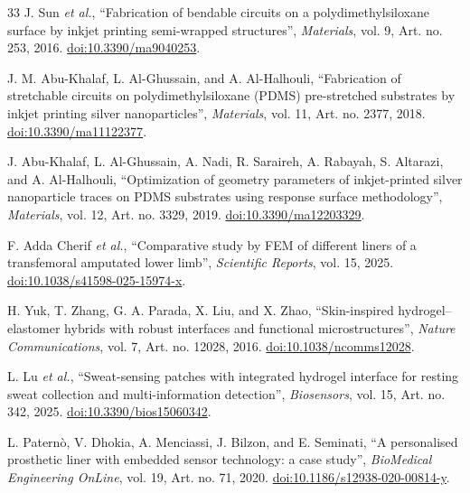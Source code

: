 \begin{thebibliography}{33}
J. Sun \textit{et al.}, \textquotedblleft Fabrication of bendable circuits on
a polydimethylsiloxane surface by inkjet printing semi-wrapped
structures\textquotedblright, \textit{Materials}, vol. 9, Art. no. 253, 2016.
\href{https://doi.org/10.3390/ma9040253}{doi:10.3390/ma9040253}.

J. M. Abu-Khalaf, L. Al-Ghussain, and A. Al-Halhouli,
\textquotedblleft Fabrication of stretchable circuits on polydimethylsiloxane
(PDMS) pre-stretched substrates by inkjet printing silver
nanoparticles\textquotedblright, \textit{Materials}, vol. 11,
Art. no. 2377, 2018.
\href{https://doi.org/10.3390/ma11122377}{doi:10.3390/ma11122377}.

J. Abu-Khalaf, L. Al-Ghussain, A. Nadi, R. Saraireh, A. Rabayah,
S. Altarazi, and A. Al-Halhouli,
\textquotedblleft Optimization of geometry parameters of inkjet-printed
silver nanoparticle traces on PDMS substrates using response surface
methodology\textquotedblright, \textit{Materials}, vol. 12,
Art. no. 3329, 2019.
\href{https://doi.org/10.3390/ma12203329}{doi:10.3390/ma12203329}.

F. Adda Cherif \textit{et al.},
\textquotedblleft Comparative study by FEM of different liners of a
transfemoral amputated lower limb\textquotedblright,
\textit{Scientific Reports}, vol. 15, 2025.
\href{https://doi.org/10.1038/s41598-025-15974-x}
{doi:10.1038/s41598-025-15974-x}.

H. Yuk, T. Zhang, G. A. Parada, X. Liu, and X. Zhao,
\textquotedblleft Skin-inspired hydrogel--elastomer hybrids with robust
interfaces and functional microstructures\textquotedblright,
\textit{Nature Communications}, vol. 7, Art. no. 12028, 2016.
\href{https://doi.org/10.1038/ncomms12028}{doi:10.1038/ncomms12028}.

L. Lu \textit{et al.}, \textquotedblleft Sweat-sensing patches with integrated
hydrogel interface for resting sweat collection and multi-information
detection\textquotedblright, \textit{Biosensors}, vol. 15, Art. no. 342, 2025.
\href{https://doi.org/10.3390/bios15060342}{doi:10.3390/bios15060342}.

L. Patern\`o, V. Dhokia, A. Menciassi, J. Bilzon, and E. Seminati,
\textquotedblleft A personalised prosthetic liner with embedded sensor
technology: a case study\textquotedblright,
\textit{BioMedical Engineering OnLine}, vol. 19, Art. no. 71, 2020.
\href{https://doi.org/10.1186/s12938-020-00814-y}
{doi:10.1186/s12938-020-00814-y}.


\end{thebibliography}
